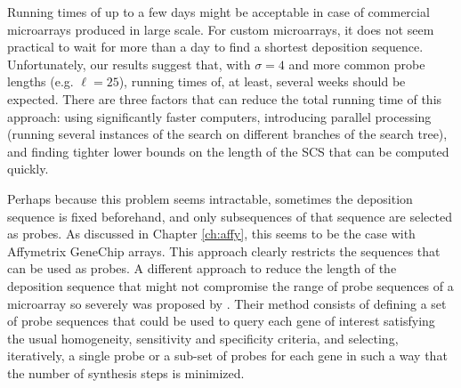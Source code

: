 Running times of up to a few days might be acceptable in case of commercial
microarrays produced in large scale. For custom microarrays, it does not seem
practical to wait for more than a day to find a shortest deposition sequence.
Unfortunately, our results suggest that, with $\sigma = 4$ and more common probe
lengths (e.g. $\ell = 25$), running times of, at least, several weeks should be
expected. There are three factors that can reduce the total running time of this
approach: using significantly faster computers, introducing parallel processing
(running several instances of the search on different branches of the search
tree), and finding tighter lower bounds on the length of the SCS that can be
computed quickly.

Perhaps because this problem seems intractable, sometimes the deposition
sequence is fixed beforehand, and only subsequences of that sequence are
selected as probes. As discussed in Chapter \ref{ch:affy}, this seems to be the
case with Affymetrix GeneChip arrays. This approach clearly restricts the
sequences that can be used as probes. A different approach to reduce the length
of the deposition sequence that might not compromise the range of probe
sequences of a microarray so severely was proposed by \citet{Tolonen2002}. Their
method consists of defining a set of probe sequences that could be used to query
each gene of interest satisfying the usual homogeneity, sensitivity and
specificity criteria, and selecting, iteratively, a single probe or a sub-set of
probes for each gene in such a way that the number of synthesis steps is
minimized.
